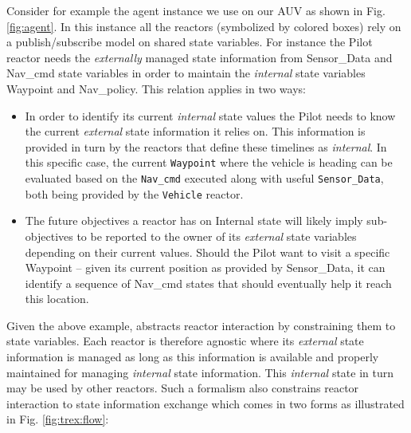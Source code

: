 Consider for example the \rx agent instance we use on our AUV as shown
in Fig. \ref{fig:agent}. In this instance all the reactors (symbolized
by colored boxes) %
rely on a publish/subscribe model on shared state variables. For
instance the \textsf{Pilot} reactor needs the {\em externally} managed
state information from \textsf{Sensor\_Data} and \textsf{Nav\_cmd}
state variables in order to maintain the \emph{internal} state
variables \textsf{Waypoint} and \textsf{Nav\_policy}. This relation
applies in two ways:

\begin{itemize}

\item In order to identify its current {\em internal} state values the
  \textsf{Pilot} needs to know the current {\em external} state
  information it relies on. This information is provided in turn by
  the reactors that define these timelines as {\em internal}. In this
  specific case, the current \texttt{Waypoint} where the vehicle is
  heading can be evaluated based on the \texttt{Nav\_cmd} executed
  along with useful \texttt{Sensor\_Data}, both being provided by the
  \texttt{Vehicle} reactor.

\item The future objectives a reactor has on \textsf{Internal} state
  will likely imply sub-objectives to be reported to the owner of its
  {\em external} state variables depending on their current
  values. Should the \textsf{Pilot} want to visit a specific
  \textsf{Waypoint} -- given its current position as provided by
  \textsf{Sensor\_Data}, it can identify a sequence of
  \textsf{Nav\_cmd} states that should eventually help it reach this
  location. %

\end{itemize}

Given the above example, \rx abstracts reactor interaction by
constraining them to state variables. Each reactor is therefore
agnostic where its {\em external} state information is managed as long
as this information is available and properly maintained for managing
{\em internal} state information. This {\em internal} state in turn
may be used by other reactors. Such a formalism also constrains
reactor interaction to state information exchange which comes in two
forms as illustrated in Fig. \ref{fig:trex:flow}:

